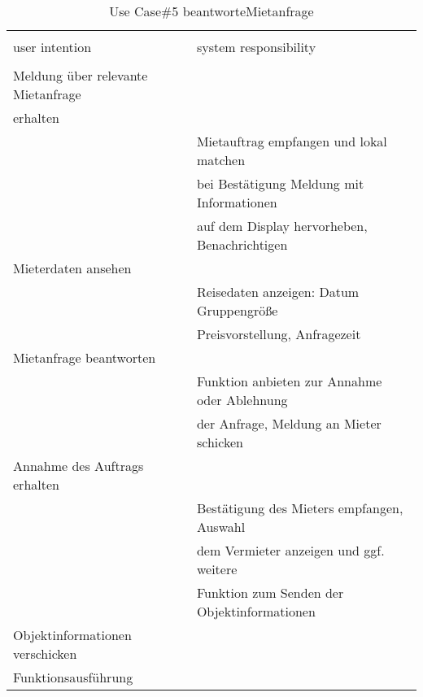 \begin{table}[H]
\caption{Use Case\#5 beantworteMietanfrage }
\centering
\begin{tabular}{l l}
\\ [-0.5ex]

\hline\hline
\\ [-0.5ex]
user intention & system responsibility
\\ [1.5ex]
\hline
\\ [-0.5ex]
Meldung über relevante Mietanfrage  &                                   \\[1ex]
erhalten                      &                                   \\[1ex]
                           & Mietauftrag empfangen und lokal matchen    \\[1ex]
                           & bei Bestätigung Meldung mit Informationen     \\[1ex]
                           & auf dem Display hervorheben, Benachrichtigen  \\[1ex]
Mieterdaten ansehen              &                                   \\[1ex]
                           & Reisedaten anzeigen: Datum Gruppengröße    \\[1ex]
                           & Preisvorstellung, Anfragezeit              \\[1ex]
Mietanfrage beantworten          &                                   \\[1ex] 
                           & Funktion anbieten zur Annahme oder Ablehnung  \\[1ex]
                           & der Anfrage, Meldung an Mieter schicken       \\[1ex]
Annahme des Auftrags erhalten    &                                   \\[1ex]
                           & Bestätigung des Mieters empfangen, Auswahl \\[1ex]
                           & dem Vermieter anzeigen und ggf. weitere       \\[1ex]
                           & Funktion zum Senden der Objektinformationen   \\[1ex]
Objektinformationen verschicken     &                                   \\[1ex]
Funktionsausführung              &                                   \\[1ex]



\hline
\end{tabular}
\label{tab:mietanfrageUC}
\end{table}

